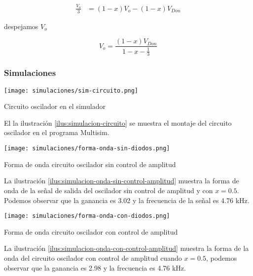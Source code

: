 \begin{align*}
    \frac{V_o}{3} &= (1-x)V_o - (1-x)V_{Don} 
\end{align*}

despejamos $V_o$

\begin{equation}
    V_o = \frac{(1-x)V_{Don}}{1-x - \frac{1}{3}}
\end{equation}

\paragraph{}

\FloatBarrier
\subsubsection{Simulaciones}

\begin{ilustracion}[ht]
    \centering
    \texttt{[image: simulaciones/sim-circuito.png]}
    \caption{Circuito oscilador en el simulador}
    \label{ilus:simulacion-circuito}
\end{ilustracion}

El la ilustración \ref{ilus:simulacion-circuito} se muestra el montaje del circuito oscilador en el programa Multisim.

\begin{ilustracion}[ht]
    \centering
    \texttt{[image: simulaciones/forma-onda-sin-diodos.png]}
    \caption{Forma de onda circuito oscilador sin control de amplitud}
    \label{ilus:simulacion-onda-sin-control-amplitud}
\end{ilustracion}

La ilustración \ref{ilus:simulacion-onda-sin-control-amplitud} muestra la forma de onda de la señal de salida del oscilador sin control de amplitud y con $x=0.5$. Podemos observar que la ganancia es 3.02 y la frecuencia de la señal es 4.76 kHz.

\begin{ilustracion}[ht]
    \centering
    \texttt{[image: simulaciones/forma-onda-con-diodos.png]}
    \caption{Forma de onda circuito oscilador con control de amplitud}
    \label{ilus:simulacion-onda-con-control-amplitud}
\end{ilustracion}

La ilustración \ref{ilus:simulacion-onda-con-control-amplitud} muestra la forma de la onda del circuito oscilador con control de amplitud cuando $x = 0.5$, podemos observar que la ganancia es 2.98 y la frecuencia es 4.76 kHz.


